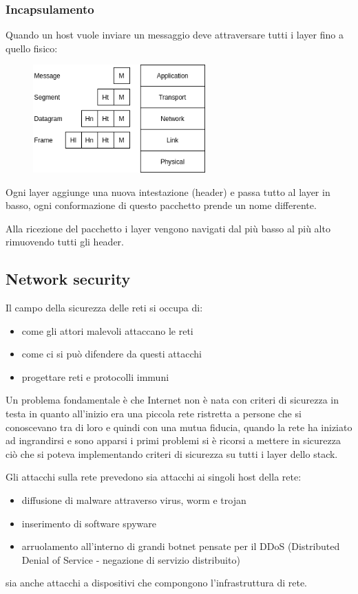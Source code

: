 \subsubsection{Incapsulamento}
Quando un host vuole inviare un messaggio deve attraversare tutti i layer fino a quello fisico:

\begin{figure}[H]
    \centering
    \includegraphics[width=250px]{images/1_Introduzione/encapsulation.png}
\end{figure}

Ogni layer aggiunge una nuova intestazione (header) e passa tutto al layer in basso, ogni conformazione di questo pacchetto prende un nome differente.

Alla ricezione del pacchetto i layer vengono navigati dal più basso al più alto rimuovendo tutti gli header. 


\subsection{Network security}
Il campo della sicurezza delle reti si occupa di:
\begin{itemize}
    \item come gli attori malevoli attaccano le reti
    \item come ci si può difendere da questi attacchi
    \item progettare reti e protocolli immuni
\end{itemize}

Un problema fondamentale è che Internet non è nata con criteri di sicurezza in testa in quanto all'inizio era una piccola rete ristretta a persone che si conoscevano tra di loro e quindi con una mutua fiducia, quando la rete ha iniziato ad ingrandirsi e sono apparsi i primi problemi si è ricorsi a mettere in sicurezza ciò che si poteva implementando criteri di sicurezza su tutti i layer dello stack.

Gli attacchi sulla rete prevedono sia attacchi ai singoli host della rete:
\begin{itemize}
    \item diffusione di malware attraverso virus, worm e trojan
    \item inserimento di software spyware 
    \item arruolamento all'interno di grandi botnet pensate per il DDoS (Distributed Denial of Service - negazione di servizio distribuito)
\end{itemize}
sia anche attacchi a dispositivi che compongono l'infrastruttura di rete.

